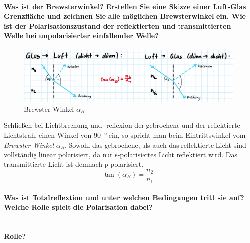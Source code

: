 \documentclass[a4paper, 11pt, ngerman, parskip=half]{scrartcl}
\begin{document}
\paragraph{Was ist der Brewsterwinkel? Erstellen Sie eine Skizze einer Luft-Glas Grenzfläche und zeichnen Sie alle möglichen Brewsterwinkel ein. Wie ist der Polarisationszustand der reflektierten
und transmittierten Welle bei unpolarisierter einfallender Welle?}
\phantom{}
\begin{figure}[H]
    \centering
    \begin{samepage}
        \includegraphics[width=\textwidth]{image/15/brewster.jpg}
        \caption{Brewster-Winkel $\alpha_B$}
        \label{fig:brewster-winkel}
    \end{samepage}
\end{figure}
%
Schließen bei Lichtbrechung und -reflexion der gebrochene und der reflektierte Lichtstrahl einen Winkel von \SI{90}{\degree} ein, so spricht man beim Eintrittswinkel vom \textit{Brewster-Winkel} $\alpha_B$. Sowohl das gebrochene, als auch das reflektierte Licht sind vollständig linear polarisiert, da nur s-polarisiertes Licht reflektiert wird. Das transmittierte Licht ist demnach p-polarisiert.
%
\begin{equation}
    \label{eq:brewster-winkel}
    \tan(\alpha_B) = \frac{n_2}{n_1}
\end{equation}



\paragraph{Was ist Totalreflextion und unter welchen Bedingungen tritt sie auf? Welche Rolle spielt die Polarisation dabei?}\mbox{}\\

\textbf{Rolle?}
\end{document}
